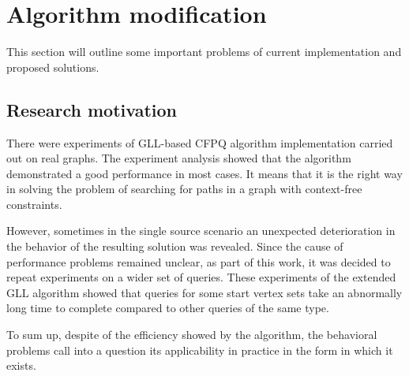 \section{Algorithm modification}\label{ps}

This section will outline some important  problems of current implementation and proposed solutions.


\subsection{Research motivation}


There were experiments of GLL-based CFPQ algorithm implementation carried out on real graphs.
The experiment analysis showed that the algorithm demonstrated a good performance in most cases. It means that it is the right way in solving the problem of searching for paths in a graph with context-free constraints.

However, sometimes in the single source scenario an unexpected deterioration in the behavior of the resulting solution was revealed. Since the cause of performance problems remained unclear, as part of this work, it was decided to repeat experiments on a wider set of queries.
These experiments of the extended GLL algorithm showed that queries for some start vertex sets take an abnormally long time to complete compared to other queries of the same type. 

To sum up, despite of the efficiency showed by the algorithm, the behavioral problems call into a question its applicability in practice in the form in which it exists.


